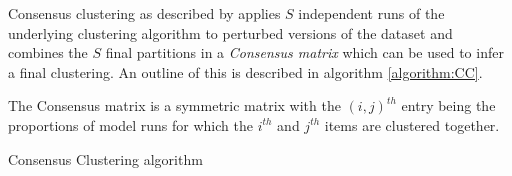\documentclass[]{article}
\begin{document}
Consensus clustering as described by \cite{monti2003consensus} applies $S$ independent runs of the underlying clustering algorithm to perturbed versions of the dataset and combines the $S$ final partitions in a \emph{Consensus matrix} which can be used to infer a final clustering. An outline of this is described in algorithm \ref{algorithm:CC}. 

The Consensus matrix is a symmetric matrix with the $(i, j)^{th}$ entry being the proportions of model runs for which the $i^{th}$ and $j^{th}$ items are clustered together. 

\begin{algorithm} \label{algorithm:CC}
	\caption{Consensus Clustering algorithm}
\end{algorithm}

\end{document}
